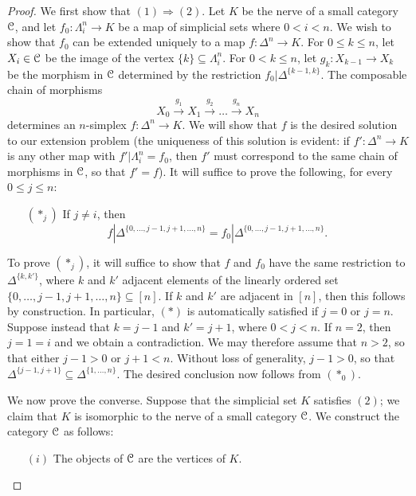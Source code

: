 \begin{1.1.2 inf-Categories}
\begin{proof}
We first show that $(1) \Rightarrow (2)$. Let $K$ be the nerve of a small category
$\operatorname{\mathcal{C}}$, and let $f_0: \Lambda^n_i \rightarrow K$ be a map of simplicial sets where
$0 < i < n$. We wish to show that $f_0$ can be extended uniquely to a map $f: \Delta^n \rightarrow K$.
For $0 \leq k \leq n$, let $X_i \in \operatorname{\mathcal{C}}$ be the image of the vertex $\{k\} \subseteq \Lambda^n_i$.
For $0 < k \leq n$, let $g_k: X_{k-1} \rightarrow X_{k}$ be the morphism in $\operatorname{\mathcal{C}}$ determined by the restriction $f_0 | \Delta^{ \{k-1,k\} }$. The composable chain of morphisms
$$ X_0 \stackrel{ g_1}{\rightarrow} X_1 \stackrel{g_2}{\rightarrow} \ldots \stackrel{g_n}{\rightarrow} X_n$$
determines an $n$-simplex $f: \Delta^n \rightarrow K$. We will show that $f$ is the desired solution to our extension problem (the uniqueness of this solution is evident: if $f': \Delta^n \rightarrow K$ is
any other map with $f' | \Lambda^n_i = f_0$, then $f'$ must correspond to the same chain of morphisms
in $\operatorname{\mathcal{C}}$, so that $f' = f$). It will suffice to prove the following, for every $0 \leq j \leq n$:
\begin{itemize}
\item[$(\ast_j)$] If $j \neq i$, then 
$$ f | \Delta^{ \{0, \ldots, j-1, j+1, \ldots, n \} } = f_0 | \Delta^{ \{0, \ldots, j-1, j+1, \ldots, n \} }.$$
\end{itemize}
To prove $(\ast_j)$, it will suffice to show that $f$ and $f_0$ have the same
restriction to $\Delta^{ \{k,k' \} }$, where $k$ and $k'$ adjacent
elements of the linearly ordered set $\{ 0, \ldots, j-1, j+1, \ldots, n \} \subseteq [n]$.
If $k$ and $k'$ are adjacent in $[n]$, then this follows by construction. In particular,
$(\ast)$ is automatically satisfied if $j=0$ or $j=n$.
Suppose instead that $k = j-1$ and $k' = j+1$, where $0 < j < n$. If $n = 2$, then $j=1=i$ and we obtain a contradiction. We may therefore assume that $n > 2$, so that either $j-1 > 0$ or
$j+1 < n$. Without loss of generality, $j-1 > 0$, so that $\Delta^{ \{ j-1, j+1 \} }
\subseteq \Delta^{ \{1, \ldots, n \} }$. The desired conclusion now follows from $(\ast_0)$.

We now prove the converse. Suppose that the simplicial set $K$ satisfies $(2)$; we claim that
$K$ is isomorphic to the nerve of a small category $\operatorname{\mathcal{C}}$. We construct the category
$\operatorname{\mathcal{C}}$ as follows:
\begin{itemize}
\item[$(i)$] The objects of $\operatorname{\mathcal{C}}$ are the vertices of $K$.


\end{itemize}
\end{proof}
\end{1.1.2 inf-Categories}
